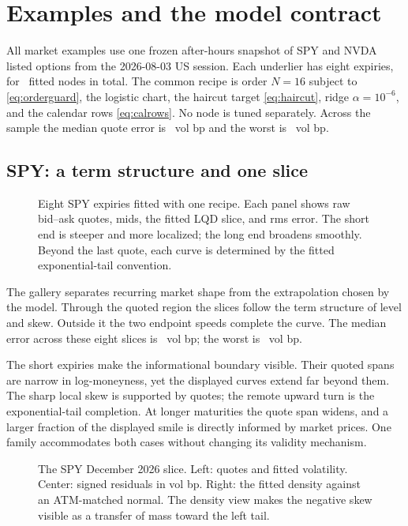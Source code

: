 \section{Examples and the model contract}
\label{sec:examples}

All market examples use one frozen after-hours snapshot of SPY and NVDA listed
options from the 2026-08-03 US session.  Each underlier has eight expiries,
for \MacSnapNodeCount\ fitted nodes in total.  The common recipe is order
$N=16$ subject to \eqref{eq:orderguard}, the logistic chart, the haircut
target \eqref{eq:haircut}, ridge $\alpha=10^{-6}$, and the calendar rows
\eqref{eq:calrows}.  No node is tuned separately.  Across the sample the
median quote error is \MacSnapMedianRmsBp\ vol bp and the worst is
\MacSnapWorstRmsBp\ vol bp.

\subsection{SPY: a term structure and one slice}

\begin{figure}[htbp]
\centering
{}
\caption{Eight SPY expiries fitted with one recipe.  Each panel shows raw
bid--ask quotes, mids, the fitted LQD slice, and rms error.  The short end is
steeper and more localized; the long end broadens smoothly.  Beyond the last
quote, each curve is determined by the fitted exponential-tail convention.}
\label{fig:spy_gallery}
\end{figure}

The gallery separates recurring market shape from the extrapolation chosen by
the model.  Through the quoted region the slices follow the term structure of
level and skew.  Outside it the two endpoint speeds complete the curve.  The
median error across these eight slices is \MacSpyGalleryMedianRmsBp\ vol bp;
the worst is \MacSpyGalleryWorstRmsBp\ vol bp.

The short expiries make the informational boundary visible.  Their quoted
spans are narrow in log-moneyness, yet the displayed curves extend far beyond
them.  The sharp local skew is supported by quotes; the remote upward turn is
the exponential-tail completion.  At longer maturities the quote span widens,
and a larger fraction of the displayed smile is directly informed by market
prices.  One family accommodates both cases without changing its validity
mechanism.

\begin{figure}[htbp]
\centering
{}
\caption{The SPY December 2026 slice.  Left: quotes and fitted volatility.
Center: signed residuals in vol bp.  Right: the fitted density against an
ATM-matched normal.  The density view makes the negative skew visible as a
transfer of mass toward the left tail.}
\label{fig:spy_node}
\end{figure}

